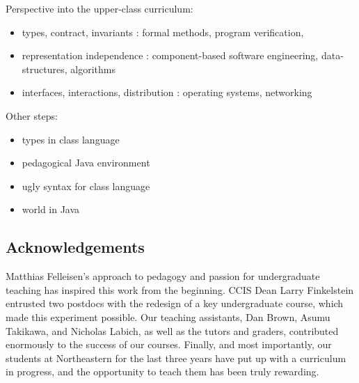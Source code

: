 \documentclass[submission,copyright]{eptcs}
\begin{document}
Perspective into the upper-class curriculum:

\begin{itemize}
\item types, contract, invariants : formal methods, program verification,
  
\item representation independence : component-based software engineering,
  data-structures, algorithms

\item interfaces, interactions, distribution : operating systems, networking
\end{itemize}


Other steps:
\begin{itemize}
\item types in class language
\item pedagogical Java environment
\item ugly syntax for class language
\item world in Java
\end{itemize}

\cite{dvanhorn:sicp}

\cite{local:htdc}

\subsection*{Acknowledgements}

Matthias Felleisen's approach to pedagogy and passion for
undergraduate teaching has inspired this work from the beginning.
CCIS Dean Larry Finkelstein entrusted two postdocs with the redesign
of a key undergraduate course, which made this experiment possible.
Our teaching assistants, Dan Brown, Asumu Takikawa, and Nicholas
Labich, as well as the tutors and graders, contributed enormously to
the success of our courses. Finally, and most importantly, our
students at Northeastern for the last three years have put up with a
curriculum in progress, and the opportunity to teach them has been
truly rewarding.



\end{document}
